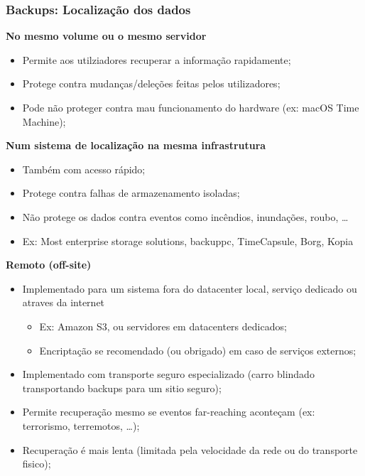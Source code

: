 \documentclass{article}
\begin{document}
\pagebreak

\subsubsection{Backups: Localização dos dados}

\begin{flushleft}
  \textbf{No mesmo volume ou o mesmo servidor}
  \begin{itemize}
    \item Permite aos utilziadores recuperar a informação rapidamente;
    \item Protege contra mudanças/deleções feitas pelos utilizadores;
    \item Pode não proteger contra mau funcionamento do hardware (ex: macOS Time Machine);
  \end{itemize}

  \textbf{Num sistema de localização na mesma infrastrutura}
  \begin{itemize}
    \item Também com acesso rápido;
    \item Protege contra falhas de armazenamento isoladas;
    \item Não protege os dados contra eventos como incêndios, inundações, roubo, \dots
    \item Ex: Most enterprise storage solutions, backuppc,
    TimeCapsule, Borg, Kopia
  \end{itemize}

  \textbf{Remoto (off-site)}
  \begin{itemize}
    \item Implementado para um sistema fora do datacenter local, serviço dedicado
    ou atraves da internet
    \begin{itemize}
      \item Ex: Amazon S3, ou servidores em datacenters dedicados;
      \item Encriptação se recomendado (ou obrigado) em caso de serviços externos;
    \end{itemize}

    \item Implementado com transporte seguro especializado (carro blindado transportando backups para um sitio seguro);
    \item Permite recuperação mesmo se eventos far-reaching aconteçam (ex: terrorismo, terremotos, \dots);
    \item Recuperação é mais lenta (limitada pela velocidade da rede ou do transporte fisico);
  \end{itemize}
\end{flushleft}
\end{document}
